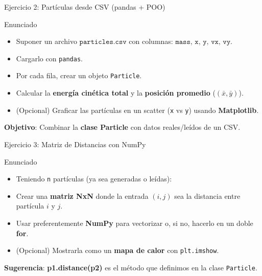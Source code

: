 \documentclass[10pt]{beamer}
\begin{document}
\begin{frame}{Ejercicio 2: Partículas desde CSV (pandas + POO)}
  \begin{block}{Enunciado}
    \begin{itemize}
      \item Suponer un archivo \(\texttt{particles.csv}\) con columnas: \(\texttt{mass, x, y, vx, vy}\).
      \item Cargarlo con \texttt{pandas}.
      \item Por cada fila, crear un objeto \texttt{Particle}.
      \item Calcular la \textbf{energía cinética total} y la \textbf{posición promedio} (\((\bar{x}, \bar{y})\)).
      \item (Opcional) Graficar las partículas en un scatter (\texttt{x} vs \texttt{y}) usando \textbf{Matplotlib}.
    \end{itemize}
  \end{block}
  \textbf{Objetivo}: Combinar la \textbf{clase Particle} con datos reales/leídos de un CSV.
\end{frame}

\begin{frame}{Ejercicio 3: Matriz de Distancias con NumPy}
  \begin{block}{Enunciado}
    \begin{itemize}
      \item Teniendo \texttt{n} partículas (ya sea generadas o leídas):
      \item Crear una \textbf{matriz NxN} donde la entrada \((i,j)\) sea la distancia entre partícula \(i\) y \(j\).
      \item Usar preferentemente \textbf{NumPy} para vectorizar o, si no, hacerlo en un doble \textbf{for}.
      \item (Opcional) Mostrarla como un \textbf{mapa de calor} con \texttt{plt.imshow}.
    \end{itemize}
  \end{block}
  \textbf{Sugerencia}: \textbf{p1.distance(p2)} es el método que definimos en la clase \texttt{Particle}.
\end{frame}
\end{document}
